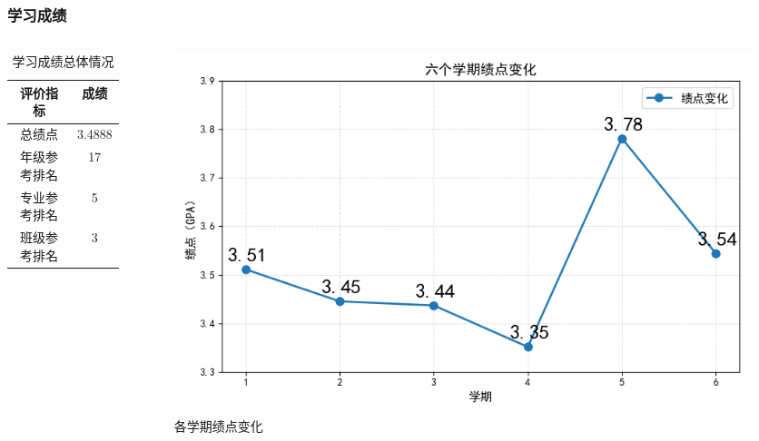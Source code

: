 \documentclass[12pt,aspectratio=169,UTF8]{beamer}
\begin{document}
\begin{frame}
  \frametitle{学习成绩}
    \begin{columns}
\begin{column}{0.4\textwidth}
\begin{table}[ht]
    \centering

    \label{tab:overall_performance}
    \begin{tabular}{cc}
        \hline
        \textbf{评价指标} & \textbf{成绩} \\
        \hline
        总绩点 & 3.4888 \\
        \hline
        年级参考排名 & 17 \\
        \hline
        专业参考排名 & 5 \\
        \hline
        班级参考排名 & 3 \\
        \hline
    \end{tabular}
        \caption{学习成绩总体情况}
\end{table}
\end{column}
\begin{column}{0.6\textwidth}
  \begin{figure}[!htbp]
\centering
\includegraphics[width =\columnwidth]{GPAs.png}
\caption{各学期绩点变化}
\label{fig:GPAs}
\end{figure}
\end{column}
\end{columns}
\end{frame}
\end{document}
